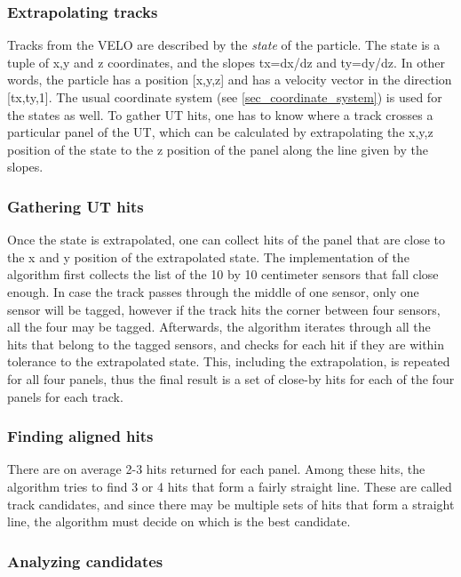 \documentclass[12pt]{article}
\begin{document}
\subsubsection{Extrapolating tracks}

Tracks from the VELO are described by the \textit{state} of the particle. The state is a tuple of x,y and z coordinates, and the slopes tx=dx/dz and ty=dy/dz. In other words, the particle has a position [x,y,z] and has a velocity vector in the direction [tx,ty,1]. The usual coordinate system (see \ref{sec_coordinate_system}) is used for the states as well. To gather UT hits, one has to know where a track crosses a particular panel of the UT, which can be calculated by extrapolating the x,y,z position of the state to the z position of the panel along the line given by the slopes.


\subsubsection{Gathering UT hits}

Once the state is extrapolated, one can collect hits of the panel that are close to the x and y position of the extrapolated state. The implementation of the algorithm first collects the list of the 10 by 10 centimeter sensors that fall close enough. In case the track passes through the middle of one sensor, only one sensor will be tagged, however if the track hits the corner between four sensors, all the four may be tagged. Afterwards, the algorithm iterates through all the hits that belong to the tagged sensors, and checks for each hit if they are within tolerance to the extrapolated state. This, including the extrapolation, is repeated for all four panels, thus the final result is a set of close-by hits for each of the four panels for each track.


\subsubsection{Finding aligned hits}

There are on average 2-3 hits returned for each panel. Among these hits, the algorithm tries to find 3 or 4 hits that form a fairly straight line. These are called track candidates, and since there may be multiple sets of hits that form a straight line, the algorithm must decide on which is the best candidate.


\subsubsection{Analyzing candidates}
\end{document}
